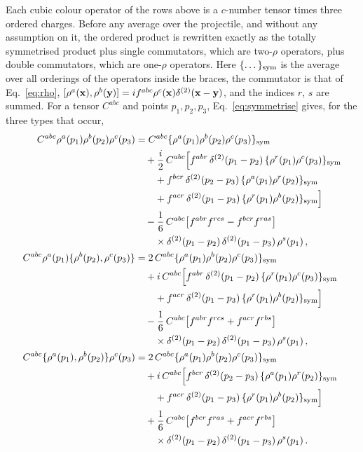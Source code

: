 Each cubic colour operator of the rows above is a $c$-number tensor times three ordered charges. Before any average over the projectile, and without any assumption on it, the ordered product is rewritten exactly as the totally symmetrised product plus single commutators, which are two-$\rho$ operators, plus double commutators, which are one-$\rho$ operators. Here $\{\dots\}_{\rm sym}$ is the average over all orderings of the operators inside the braces, the commutator is that of Eq.~\eqref{eq:rho}, $[\rho^a(\mathbf{x}),\rho^b(\mathbf{y})]=if^{abc}\rho^c(\mathbf{x})\delta^{(2)}(\mathbf{x}-\mathbf{y})$, and the indices $r$, $s$ are summed. For a tensor $C^{abc}$ and points $p_1,p_2,p_3$, Eq.~\eqref{eq:symmetrise} gives, for the three types that occur,
\begin{align}\label{eq:app_symord}
C^{abc}\rho^a(p_1)\rho^b(p_2)\rho^c(p_3)&=C^{abc}\{\rho^a(p_1)\rho^b(p_2)\rho^c(p_3)\}_{\rm sym}\notag\\
&\quad+\frac i2\,C^{abc}\Big[f^{abr}\,\delta^{(2)}(p_1-p_2)\,\{\rho^r(p_1)\rho^c(p_3)\}_{\rm sym}\notag\\
&\qquad+f^{bcr}\,\delta^{(2)}(p_2-p_3)\,\{\rho^a(p_1)\rho^r(p_2)\}_{\rm sym}\notag\\
&\qquad+f^{acr}\,\delta^{(2)}(p_1-p_3)\,\{\rho^r(p_1)\rho^b(p_2)\}_{\rm sym}\Big]\notag\\
&\quad-\frac16\,C^{abc}\big[f^{abr}f^{rcs}-f^{bcr}f^{ras}\big]\notag\\
&\qquad\times\delta^{(2)}(p_1-p_2)\,\delta^{(2)}(p_1-p_3)\,\rho^s(p_1)\,,\\
\label{eq:app_syma23}
C^{abc}\rho^a(p_1)\{\rho^b(p_2),\rho^c(p_3)\}&=2\,C^{abc}\{\rho^a(p_1)\rho^b(p_2)\rho^c(p_3)\}_{\rm sym}\notag\\
&\quad+i\,C^{abc}\Big[f^{abr}\,\delta^{(2)}(p_1-p_2)\,\{\rho^r(p_1)\rho^c(p_3)\}_{\rm sym}\notag\\
&\qquad+f^{acr}\,\delta^{(2)}(p_1-p_3)\,\{\rho^r(p_1)\rho^b(p_2)\}_{\rm sym}\Big]\notag\\
&\quad-\frac16\,C^{abc}\big[f^{abr}f^{rcs}+f^{acr}f^{rbs}\big]\notag\\
&\qquad\times\delta^{(2)}(p_1-p_2)\,\delta^{(2)}(p_1-p_3)\,\rho^s(p_1)\,,\\
\label{eq:app_syma12}
C^{abc}\{\rho^a(p_1),\rho^b(p_2)\}\rho^c(p_3)&=2\,C^{abc}\{\rho^a(p_1)\rho^b(p_2)\rho^c(p_3)\}_{\rm sym}\notag\\
&\quad+i\,C^{abc}\Big[f^{bcr}\,\delta^{(2)}(p_2-p_3)\,\{\rho^a(p_1)\rho^r(p_2)\}_{\rm sym}\notag\\
&\qquad+f^{acr}\,\delta^{(2)}(p_1-p_3)\,\{\rho^r(p_1)\rho^b(p_2)\}_{\rm sym}\Big]\notag\\
&\quad+\frac16\,C^{abc}\big[f^{bcr}f^{ras}+f^{acr}f^{rbs}\big]\notag\\
&\qquad\times\delta^{(2)}(p_1-p_2)\,\delta^{(2)}(p_1-p_3)\,\rho^s(p_1)\,.
\end{align}
